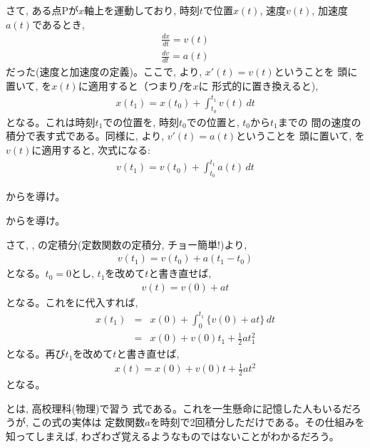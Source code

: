 さて, ある点Pが$x$軸上を運動しており, 時刻$t$で位置$x(t)$, 速度$v(t)$, 加速度$a(t)$であるとき, 
\begin{eqnarray}
\frac{dx}{dt}=v(t)\label{eq:dxdt_v}\\
\frac{dv}{dt}=a(t)\label{eq:dvdt_a}
\end{eqnarray}
だった(速度と加速度の定義)。ここで, より, $x'(t)=v(t)$ということを
頭に置いて, を$x(t)$に適用すると（つまり$f$を$x$に
形式的に置き換えると), 
\begin{eqnarray}
x(t_1)=x(t_0)+\int_{t_0}^{t_1}v(t)\, dt\label{eq:x1_x0_intv}
\end{eqnarray}
となる。これは時刻$t_1$での位置を, 時刻$t_0$での位置と, $t_0$から$t_1$までの
間の速度の積分で表す式である。同様に, より, $v'(t)=a(t)$ということを
頭に置いて, を$v(t)$に適用すると, 次式になる:
\begin{eqnarray}
v(t_1)=v(t_0)+\int_{t_0}^{t_1}a(t)\, dt\label{eq:v1_v0_inta}
\end{eqnarray}

\begin{q}\label{q:x_v_dif_int} からを導け。\end{q}

\begin{q}\label{q:v_a_dif_int} からを導け。\end{q}
\mv

さて, , 
の定積分(定数関数の定積分, チョー簡単!)より, 
\begin{eqnarray}v(t_1)=v(t_0)+a(t_1-t_0)\end{eqnarray}
となる。$t_0=0$とし, $t_1$を改めて$t$と書き直せば, 
\begin{eqnarray}v(t)=v(0)+at\label{eq:v_v0_at}\end{eqnarray}
となる。これをに代入すれば, 
\begin{eqnarray}
x(t_1)&=&x(0)+\int_{0}^{t_1}\{v(0)+at\}\, dt\nonumber\\
      &=&x(0)+v(0)t_1+\frac{1}{2}at_1^2\label{eq:x_x0_va0}
\end{eqnarray}
となる。再び$t_1$を改めて$t$と書き直せば,
\begin{eqnarray}x(t)=x(0)+v(0)t+\frac{1}{2}at^2\label{eq:x_x0_va}\end{eqnarray}
となる。

とは, 高校理科(物理)で習う
式である。これを一生懸命に記憶した人もいるだろうが, この式の実体は
定数関数$a$を時刻で2回積分しただけである。その仕組みを知ってしまえば, 
わざわざ覚えるようなものではないことがわかるだろう。


